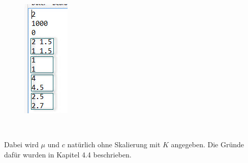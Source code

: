 \documentclass[11pt, a4paper, german]{article}
\theoremstyle{plain}
\begin{document}
	\begin{center}
	\begin{minipage}{0.15\textwidth}
		\begin{figure}[H]
			\centering
			\includegraphics[width=0.9\linewidth]{./Pictures/Parameter}
		\end{figure}
	\end{minipage}
	$ \quad $
	\begin{minipage}{0.6\textwidth}
		Dabei wird $ \mu $ und $ c $ natürlich ohne Skalierung mit $ K $ angegeben. Die Gründe dafür wurden in Kapitel 4.4 beschrieben.\\
		

\end{minipage}
\end{center}
\end{document}
